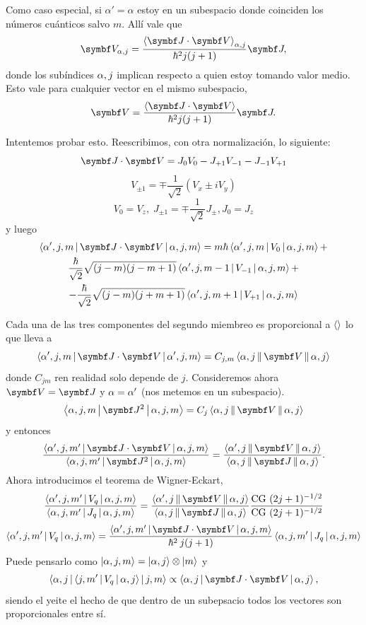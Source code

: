 \documentclass[10pt,oneside]{CBFT_book}
\begin{document}
Como caso especial, si $\alpha' =\alpha$ estoy en un subespacio donde coinciden los números cuánticos
salvo $m$. Allí vale que 
\[
	\vb{V}_{\a,j} = \frac{ \Braket{\vb{J}\cdot\vb{V}}_{\a,j} }{\hbar^2j(j+1)} \vb{J},
\]
donde los subíndices $\alpha,j$ implican respecto a quien estoy tomando valor medio. Esto vale para cualquier
vector en el mismo subespacio,
\[
	\vb{V} = \frac{\Braket{\vb{J}\cdot\vb{V}}}{\hbar^2j(j+1)} \vb{J}.
\]

Intentemos probar esto. Reescribimos, con otra normalización, lo siguiente:
\[
	\pe{J}{V} = J_0 V_0 - J_{+1} V_{-1} - J_{-1} V_{+1}
\]
\[
	V_{\pm 1} = \mp \frac{1}{\sqrt{2}}( V_x \pm i V_y)
\]
\[
	V_0 = V_z, \; J_{\pm 1} = \mp \frac{1}{\sqrt{2}} J_{\pm}, J_0 = J_z
\]
y luego
\begin{multline*}
 \Braket{ \a', j, m | \pe{J}{V} | \a, j, m } = m \hbar \Braket{ \a', j, m | V_0 | \a, j, m } + \\
	\frac{\hbar}{\sqrt{2}} \sqrt{(j-m)(j-m+1)} \Braket{ \a', j, m-1 | V_{-1} | \a, j, m } + \\
	- \frac{\hbar}{\sqrt{2}} \sqrt{(j-m)(j+m+1)} \Braket{ \a', j, m+1 | V_{+1} | \a, j, m }
\end{multline*}

Cada una de las tres componentes del segundo miembreo es proporcional a $\Braket{}$ lo que lleva a
\[
	\Braket{ \a', j, m | \pe{J}{V} | \a', j, m } = C_{j,m} \Braket{ \a, j || \vb V || \a, j }
\]
donde $C_{jm}$ ren realidad solo depende de $j$. Consideremos ahora $\vb V = \vb J$ y $\alpha = \alpha'$
(nos metemos en un subespacio).
\[
	\Braket{ \a, j, m | \vb J^2 | \a, j, m } = C_j \Braket{ \a, j || \vb V || \a, j }
\]
y entonces
\[
	\frac{\Braket{ \a', j, m' | \pe{J}{V} | \a, j, m }}{\Braket{ \a, j, m' | \vb J^2 | \a, j, m }} = 
	\frac{\Braket{ \a', j || \vb V || \a, j }}{\Braket{ \a, j || \vb J || \a, j }}.
\]
Ahora introducimos el teorema de Wigner-Eckart,
\[
	\frac{\Braket{ \a', j, m' | V_q | \a, j, m }}{\Braket{ \a, j, m' | J_q | \a, j, m }} = 
	\frac{\Braket{ \a', j || \vb V || \a, j }}{\Braket{ \a, j || \vb J || \a, j }}
	\frac{ \text{CG } (2j+1)^{-1/2}}{\text{CG } (2j+1)^{-1/2} }
\]
\[
	\Braket{ \a', j, m' | V_q | \a, j, m } =
	\frac{\Braket{ \a', j, m' | \pe{J}{V} | \a, j, m }}{\hbar^2 \: j (j+1)}
	\Braket{ \a, j, m' | J_q | \a, j, m }
\]
Puede pensarlo como $\Ket{\alpha,j,m} = \Ket{\alpha,j}\otimes\Ket{m}$ y 
\[
	\Braket{ \a, j |\Braket{j,m'|V_q|\a,j} | j,m } \propto \Braket{\a,j|\pe{J}{V}|\a,j},
\]
siendo el yeite el hecho de que dentro de un subepsacio todos los vectores son proporcionales
entre sí.
\end{document}
